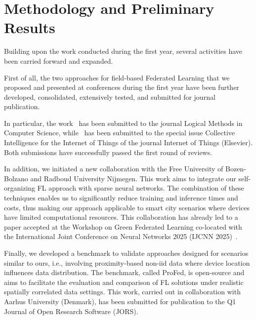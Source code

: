 \documentclass[runningheads]{llncs}
\begin{document}
\section{Methodology and Preliminary Results}\label{sec:methodology}
Building upon the work conducted during the first year, 
 several activities have been carried forward and expanded.

First of all, the two approaches for field-based Federated Learning that we proposed and presented 
 at conferences during the first year have been further developed, consolidated, extensively tested, 
 and submitted for journal publication. 
 
In particular, the work~\cite{DBLP:conf/coordination/DominiAEV24}
 has been submitted to the journal Logical Methods in Computer Science, 
 while~\cite{DBLP:conf/acsos/DominiFAVE24} has been submitted to the special issue
 Collective Intelligence for the Internet of Things of the journal Internet of Things (Elsevier). 
% 
Both submissions have successfully passed the first round of reviews.

In addition, we initiated a new collaboration with the Free University of Bozen-Bolzano 
 and Radboud University Nijmegen. 
%
This work aims to integrate our self-organizing FL approach with sparse neural networks. 
%
The combination of these techniques enables us to significantly reduce training and inference times and costs, 
 thus making our approach applicable to smart city scenarios where devices have limited computational resources. 
%
This collaboration has already led to a paper accepted at the Workshop on Green Federated Learning 
 co-located with the International Joint Conference on Neural Networks 2025 (IJCNN 2025)~\cite{DBLP:journals/corr/abs-2507-07613}.

Finally, we developed a benchmark to validate approaches designed for scenarios similar to ours, 
 i.e., involving proximity-based non-iid data where device location influences data distribution. 
% 
The benchmark, called ProFed, is open-source and aims to facilitate the evaluation and comparison 
 of FL solutions under realistic spatially correlated data settings. 
% 
This work, carried out in collaboration with Aarhus University (Denmark), 
 has been submitted for publication to the Q1 Journal of Open Research Software (JORS).

\end{document}
